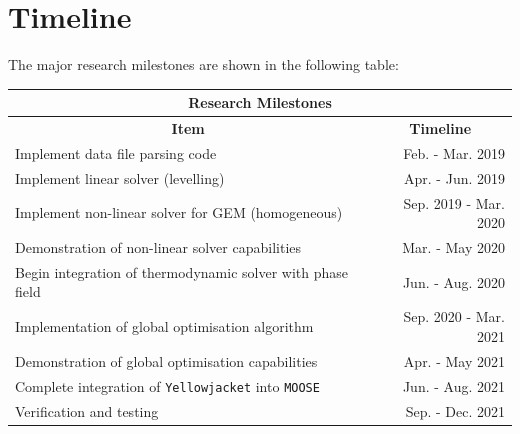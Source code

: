 \section*{Timeline}
The major research milestones are shown in the following table:
	\begin{table}[!htbp]
		\centering	
  		\begin{tabular}{@{}l r@{}}
		\toprule
		\multicolumn{2}{c}{\textbf{Research Milestones}}\\
		\midrule
		\multicolumn{1}{c}{\textbf{Item}} & \multicolumn{1}{c}{\textbf{Timeline}}\\
		\midrule

		Implement data file parsing code & Feb. - Mar. 2019 \\
		Implement linear solver (levelling) & Apr. - Jun. 2019\\
		Implement non-linear solver for GEM (homogeneous) & Sep. 2019 - Mar. 2020 \\
		Demonstration of non-linear solver capabilities & Mar. - May 2020 \\
		Begin integration of thermodynamic solver with phase field & Jun. - Aug. 2020 \\ 
		Implementation of global optimisation algorithm & Sep. 2020 - Mar. 2021 \\
		Demonstration of global optimisation capabilities & Apr. - May 2021 \\
		Complete integration of \texttt{Yellowjacket} into \texttt{MOOSE} & Jun. - Aug. 2021 \\
		Verification and testing & Sep. - Dec. 2021 \\
		\bottomrule
      		\end{tabular}
	\end{table}
	
